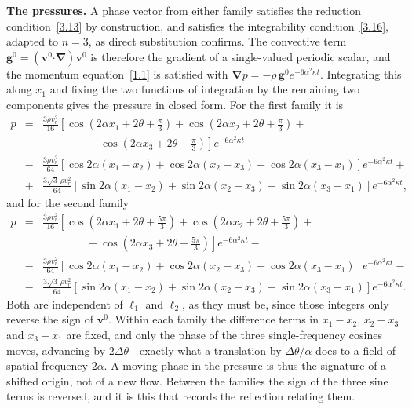 \documentclass[11pt]{jfm}
\providecommand\bnabla{\boldsymbol{\nabla}}
\providecommand\bcdot{\boldsymbol{\cdot}}
\numberwithin{equation}{section}
\begin{document}
\medskip
\noindent\textbf{The pressures.} A phase vector from either family satisfies the reduction
condition~\eqref{3.13} by construction, and satisfies the integrability condition~\eqref{3.16},
adapted to $n=3$, as direct substitution confirms. The convective term
$\boldsymbol{g}^0=(\boldsymbol{v}^0\bcdot\bnabla)\boldsymbol{v}^0$ is therefore the gradient of a
single-valued periodic scalar, and the momentum equation~\eqref{1.1} is satisfied with
$\bnabla p=-\rho\,\boldsymbol{g}^0e^{-6\alpha^2\kappa t}$. Integrating this along $x_1$ and
fixing the two functions of integration by the remaining two components gives the pressure in
closed form. For the first family it is
\begin{eqnarray}
\label{4.pI}
p&=&\frac{3\rho v_r^2}{16}\left[\cos\!\left(2\alpha x_1+2\theta+\frac{\pi}{3}\right)
+\cos\!\left(2\alpha x_2+2\theta+\frac{\pi}{3}\right)+\right.\nonumber\\
&&\left.\qquad\qquad+\cos\!\left(2\alpha x_3+2\theta+\frac{\pi}{3}\right)\right]
e^{-6\alpha^2\kappa t}-\nonumber\\
&-&\frac{3\rho v_r^2}{64}\left[\cos 2\alpha(x_1-x_2)+\cos 2\alpha(x_2-x_3)
+\cos 2\alpha(x_3-x_1)\right]e^{-6\alpha^2\kappa t}+\nonumber\\
&+&\frac{3\sqrt3\,\rho v_r^2}{64}\left[\sin 2\alpha(x_1-x_2)+\sin 2\alpha(x_2-x_3)
+\sin 2\alpha(x_3-x_1)\right]e^{-6\alpha^2\kappa t},
\end{eqnarray}
and for the second family
\begin{eqnarray}
\label{4.pII}
p&=&\frac{3\rho v_r^2}{16}\left[\cos\!\left(2\alpha x_1+2\theta+\frac{5\pi}{3}\right)
+\cos\!\left(2\alpha x_2+2\theta+\frac{5\pi}{3}\right)+\right.\nonumber\\
&&\left.\qquad\qquad+\cos\!\left(2\alpha x_3+2\theta+\frac{5\pi}{3}\right)\right]
e^{-6\alpha^2\kappa t}-\nonumber\\
&-&\frac{3\rho v_r^2}{64}\left[\cos 2\alpha(x_1-x_2)+\cos 2\alpha(x_2-x_3)
+\cos 2\alpha(x_3-x_1)\right]e^{-6\alpha^2\kappa t}-\nonumber\\
&-&\frac{3\sqrt3\,\rho v_r^2}{64}\left[\sin 2\alpha(x_1-x_2)+\sin 2\alpha(x_2-x_3)
+\sin 2\alpha(x_3-x_1)\right]e^{-6\alpha^2\kappa t}.
\end{eqnarray}
Both are independent of $\ell_1$ and $\ell_2$, as they must be, since those integers only reverse
the sign of $\boldsymbol{v}^0$. Within each family the difference terms in $x_1-x_2$, $x_2-x_3$ and
$x_3-x_1$ are fixed, and only the phase of the three single-frequency cosines moves, advancing by
$2\Delta\theta$---exactly what a translation by $\Delta\theta/\alpha$ does to a field of spatial
frequency $2\alpha$. A moving phase in the pressure is thus the signature of a shifted origin, not
of a new flow. Between the families the sign of the three sine terms is reversed, and it is this
that records the reflection relating them.
\end{document}
